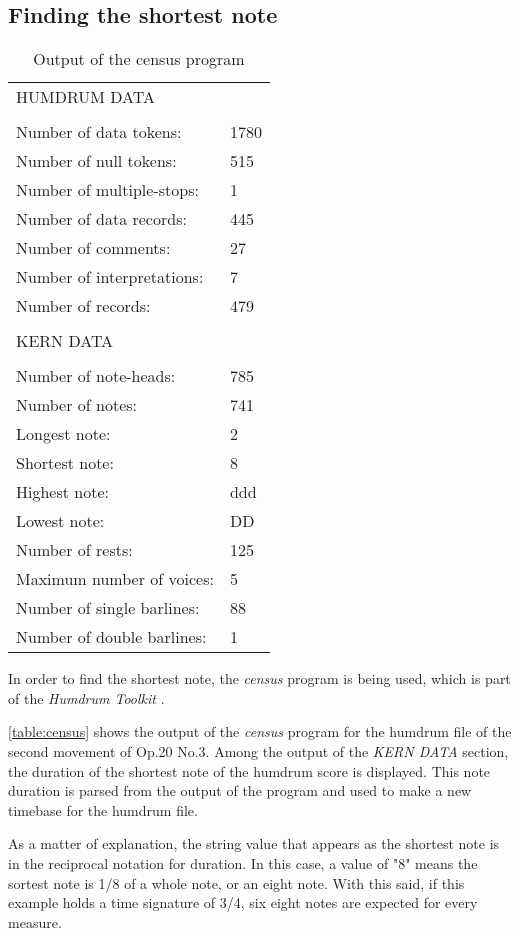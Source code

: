 	\subsection{Finding the shortest note}
		\begin{table}[]
		\centering
		\begin{tabular}{ll}
		HUMDRUM DATA &  \\
		 &  \\
		Number of data tokens: & 1780 \\
		Number of null tokens: & 515 \\
		Number of multiple-stops: & 1 \\
		Number of data records: & 445 \\
		Number of comments: & 27 \\
		Number of interpretations: & 7 \\
		Number of records: & 479 \\
		 &  \\
		KERN DATA &  \\
		 &  \\
		Number of note-heads: & 785 \\
		Number of notes: & 741 \\
		Longest note: & 2 \\
		Shortest note: & 8 \\
		Highest note: & ddd \\
		Lowest note: & DD \\
		Number of rests: & 125 \\
		Maximum number of voices: & 5 \\
		Number of single barlines: & 88 \\
		Number of double barlines: & 1
		\end{tabular}
		\caption{Output of the census program}
		\label{table:census}
		\end{table}

		In order to find the shortest note, the \emph{census} program is being used, which is part of the \emph{Humdrum Toolkit} \cite{humdrum}.

		\autoref{table:census} shows the output of the \emph{census} program for the humdrum file of the second movement of Op.20 No.3. Among the output of the \emph{KERN DATA} section, the duration of the shortest note of the humdrum score is displayed. This note duration is parsed from the output of the program and used to make a new timebase for the humdrum file.

		As a matter of explanation, the string value that appears as the shortest note is in the reciprocal notation for duration. In this case, a value of "8" means the sortest note is 1/8 of a whole note, or an eight note. With this said, if this example holds a time signature of 3/4, six eight notes are expected for every measure.

